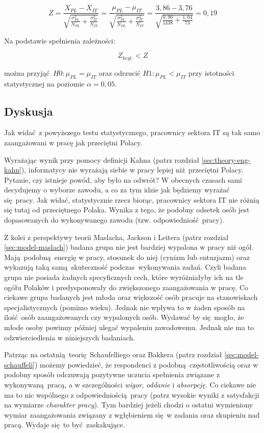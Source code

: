 \begin{equation}
  Z = \frac{\overline{X_{PL}} - \overline{X_{IT}}}{\sqrt{\frac{\sigma^2_{PL}}{N_{PL}}+\frac{\sigma^2_{IT}}{N_{IT}}}} = \frac{\mu_{PL} - \mu_{IT}}{\sqrt{\frac{\sigma^2_{PL}}{N_{PL}}+\frac{\sigma^2_{IT}}{N_{IT}}}} = \frac{3,86- 3,76}{\sqrt{\frac{0,90}{1438}+\frac{1,04}{73}}} = 0,19
\end{equation}

Na podstawie spełnienia zależności:

\begin{equation}
  Z_{kryt.} < Z
\end{equation}

można przyjąć $H0: \mu_{PL} = \mu_{IT}$ oraz odrzucić $H1: \mu_{PL} < \mu_{IT}$ przy istotności statystycznej na poziomie $\alpha = 0,05$.

\subsection{Dyskusja}
Jak widać z powyższego testu statystycznego, pracownicy sektora IT są tak samo zaangażowani w pracę jak przeciętni Polacy.

Wyrażając wynik przy pomocy definicji Kahna (patrz rozdział \ref{sec:theory-eng-kahn}), informatycy nie wyrażają siebie w pracy lepiej niż przeciętni Polacy. Pytanie, czy istnieje powód, aby było na odwrót? W obecnych czasach sami decydujemy o wyborze zawodu, a co za tym idzie jak będziemy wyrażać się pracy. Jak widać, statystycznie rzecz biorąc, pracownicy sektora IT nie różnią się tutaj od przeciętnego Polaka. Wynika z tego, że podobny odsetek osób jest dopasowanych do
wykonywanego zawodu (tzw. odpowiedniość pracy).

Z kolei z perspektywy teorii Maslacha, Jackson i Leitera (patrz rozdział \ref{sec:model-maslach}) badana grupa nie jest bardziej wypalona w pracy niż ogół. Mają podobną energię w pracy, stosunek do niej (cynizm lub entuzjazm) oraz wykazują taką samą skuteczność podczas wykonywania zadań. Czyli badana grupa nie posiada żadnych specyficznych cech, które wyróżniałyby ich na tle ogółu Polaków i predysponowały do zwiększonego zaangażowania w pracę. Co ciekawe grupa badanych
jest młoda oraz większość osób pracuje na stanowiskach specjalistycznych (pomimo wieku). Jednak nie wpływa to w żaden sposób na
ilość osób zaangażowanych czy wypalonych osób. Wydawać by się mogło, że młode osoby powinny później ulegać wypaleniu zawodowemu. Jednak nie ma to odzwierciedlenia w niniejszych badaniach.

Patrząc na ostatnią teorię Schaufelliego oraz Bakkera (patrz rozdział \ref{sec:model-schauffeli}) możemy powiedzieć, że respondenci z podobną częstotliwością oraz w podobny sposób odczuwają pozytywne uczucia spełnienia związane z wykonywaną pracą, a w szczególności \textit{wigor}, \textit{oddanie} i \textit{absorpcję}. Co ciekawe nie ma to nic wspólnego z odpowiedniością pracy (patrz wysokie wyniki z satysfakcji na wymiarze \textit{charakter pracy}). Tym bardziej
jeżeli chodzi o ostatni wymieniony wymiar zaangażowania związany z wgłębieniem się w zadania oraz skupieniu nad pracą. Wydaje się to być zaskakujące.
